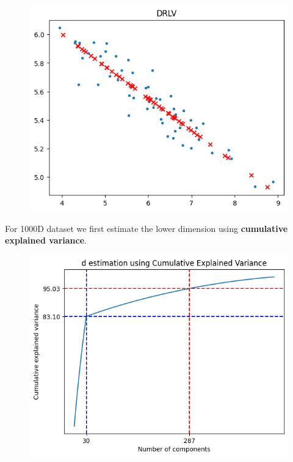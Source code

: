 \begin{soln}
\begin{figure}[H]
    \end{figure}
    \begin{figure}[H]
        \centering
        \includegraphics[scale=0.35]{Images/q24/q24_drlv.png}
    \end{figure}

    For 1000D dataset we first estimate the lower dimension using \textbf{cumulative explained variance}. 
    
    \begin{figure}[H]
        \centering
        \includegraphics[scale=0.4]{Images/q24/q24_d_est.png}
    \end{figure}


\end{soln}
